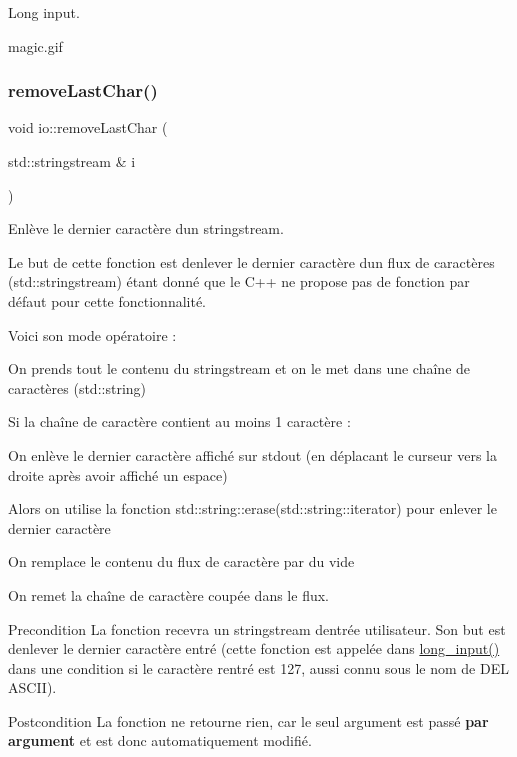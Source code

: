 Long input. 

magic.\+gif \mbox{\label{namespaceio_a0ed486192687092d372440a79c3a65a3}} 
\subsubsection{\texorpdfstring{remove\+Last\+Char()}{removeLastChar()}}
{\footnotesize\ttfamily void io\+::remove\+Last\+Char (\begin{DoxyParamCaption}\item[{std\+::stringstream \&}]{i }\end{DoxyParamCaption})}



Enlève le dernier caractère d\textquotesingle{}un stringstream. 

Le but de cette fonction est d\textquotesingle{}enlever le dernier caractère d\textquotesingle{}un flux de caractères (std\+::stringstream) étant donné que le C++ ne propose pas de fonction par défaut pour cette fonctionnalité.

Voici son mode opératoire \+:
\begin{DoxyEnumerate}
\item On prends tout le contenu du stringstream et on le met dans une chaîne de caractères (std\+::string)
\item Si la chaîne de caractère contient au moins 1 caractère \+:
\begin{DoxyEnumerate}
\item On enlève le dernier caractère affiché sur stdout (en déplacant le curseur vers la droite après avoir affiché un espace)
\item Alors on utilise la fonction std\+::string\+::erase(std\+::string\+::iterator) pour enlever le dernier caractère
\item On remplace le contenu du flux de caractère par du vide
\item On remet la chaîne de caractère coupée dans le flux.
\end{DoxyEnumerate}
\end{DoxyEnumerate}

\begin{DoxyPrecond}{Precondition}
La fonction recevra un stringstream d\textquotesingle{}entrée utilisateur. Son but est d\textquotesingle{}enlever le dernier caractère entré (cette fonction est appelée dans \hyperlink{namespaceio_ab044be3afd7ac04eeb1a496af0f1d5c6}{long\+\_\+input()} dans une condition si le caractère rentré est 127, aussi connu sous le nom de D\+EL A\+S\+C\+II). 
\end{DoxyPrecond}
\begin{DoxyPostcond}{Postcondition}
La fonction ne retourne rien, car le seul argument est passé {\bfseries par argument} et est donc automatiquement modifié. 
\end{DoxyPostcond}


